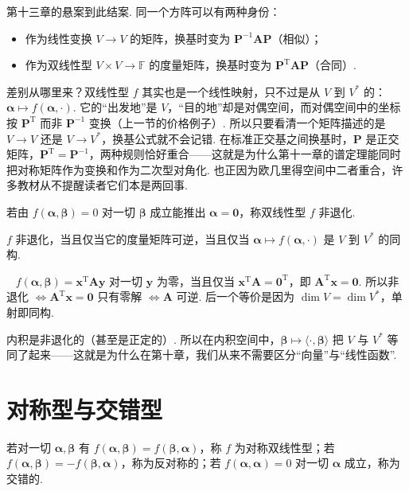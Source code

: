 \documentclass[lang=cn,10.5pt,scheme=chinese,toc=twocol,section,chinesefont=nofont,
twoside,citestyle=gb7714-2015,bibstyle=gb7714-2015]{elegantbook}
\DeclareRobustCommand{\textbf}[1]{{\lnsemiboldlatin\lnsemiboldcjk #1}}
\newcommand{\vv}[1]{\boldsymbol{#1}}
\newcommand{\zero}{\boldsymbol{0}}          %
\newcommand{\trans}{\mathrm{T}}             %
\numberwithin{equation}{section}   %
\newcommand*{\lnlabel}[1]{{\sffamily\bfseries\color{black}#1}}
\renewenvironment{proof}{%
	\par\noindent\lnlabel{\proofname}\;\ \color{black!90}\cfs}{\par}
\begin{document}
\begin{motivebox}
  第十三章的悬案到此结案. \textbf{同一个方阵可以有两种身份}：
  \begin{itemize}
    \item 作为线性变换 $V\to V$ 的矩阵，换基时变为 $\vv P^{-1}\vv A\vv P$（相似）；
    \item 作为双线性型 $V\times V\to\mathbb{F}$ 的度量矩阵，换基时变为 $\vv P^\trans\vv A\vv P$（合同）.
  \end{itemize}
  差别从哪里来？双线性型 $f$ 其实也是一个线性映射，只不过是从 $V$ 到 $V^*$ 的：$\vv\alpha\mapsto f(\vv\alpha,\cdot)$. 它的“出发地”是 $V$，“目的地”却是对偶空间，而对偶空间中的坐标按 $\vv P^\trans$ 而非 $\vv P^{-1}$ 变换（上一节的价格例子）. 所以只要看清一个矩阵描述的是 $V\to V$ 还是 $V\to V^*$，换基公式就不会记错. 在标准正交基之间换基时，$\vv P$ 是正交矩阵，$\vv P^\trans=\vv P^{-1}$，两种规则恰好重合——这就是为什么第十一章的谱定理能\textbf{同时}把对称矩阵作为变换和作为二次型对角化. 也正因为欧几里得空间中二者重合，许多教材从不提醒读者它们本是两回事.
\end{motivebox}

\begin{definition}
  若由 $f(\vv\alpha,\vv\beta)=0$ 对一切 $\vv\beta$ 成立能推出 $\vv\alpha=\zero$，称双线性型 $f$ \textbf{非退化}.
\end{definition}

\begin{proposition}
  $f$ 非退化，当且仅当它的度量矩阵可逆，当且仅当 $\vv\alpha\mapsto f(\vv\alpha,\cdot)$ 是 $V$ 到 $V^*$ 的同构.
\end{proposition}
\begin{proof}
  $f(\vv\alpha,\vv\beta)=\vv x^\trans\vv A\vv y$ 对一切 $\vv y$ 为零，当且仅当 $\vv x^\trans\vv A=\zero^\trans$，即 $\vv A^\trans\vv x=\zero$. 所以非退化 $\iff\vv A^\trans\vv x=\zero$ 只有零解 $\iff\vv A$ 可逆. 后一个等价是因为 $\dim V=\dim V^*$，单射即同构.
\end{proof}

内积是非退化的（甚至是正定的）. 所以在内积空间中，$\vv\beta\mapsto\langle\cdot,\vv\beta\rangle$ 把 $V$ 与 $V^*$ 等同了起来——这就是为什么在第十章，我们从来不需要区分“向量”与“线性函数”.

\section{对称型与交错型}

\begin{definition}
  若对一切 $\vv\alpha,\vv\beta$ 有 $f(\vv\alpha,\vv\beta)=f(\vv\beta,\vv\alpha)$，称 $f$ 为\textbf{对称}双线性型；若 $f(\vv\alpha,\vv\beta)=-f(\vv\beta,\vv\alpha)$，称为\textbf{反对称}的；若 $f(\vv\alpha,\vv\alpha)=0$ 对一切 $\vv\alpha$ 成立，称为\textbf{交错}的.
\end{definition}
\end{document}
